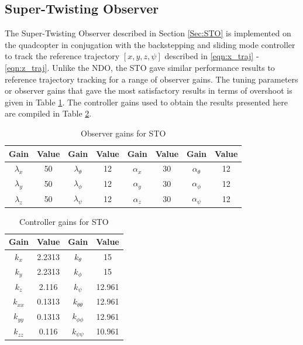\documentclass[letterpaper%
, twoside%
, 12pt%
,memoire%
, english%
,creativecommons,hyperref%
]{thETS}
\begin{document}
\subsection{Super-Twisting Observer}
The Super-Twisting Observer described in Section \ref{Sec:STO} is implemented on the quadcopter in conjugation with the backstepping and sliding mode controller to track the reference trajectory $[x,y,z,\psi]$ described in \eqref{eqn:x_traj} - \eqref{eqn:z_traj}. Unlike the NDO, the STO gave similar performance results to reference trajectory tracking for a range of observer gains. The tuning parameters or observer gains that gave the most satisfactory results in terms of overshoot is given in Table \ref{Tab:realSTOGains}. The controller gains used to obtain the results presented here are compiled in Table \ref{Tab:realControllerGainsSTO}. 

\begin{table}
\parbox{0.65\textwidth}{\caption{Observer gains for STO} \label{Tab:realSTOGains}} 
\begin{tabular}{|c|c|c|c|c|c|c|c|}
\hline
{\bf Gain}&{\bf Value}&{\bf Gain}&{\bf Value}&{\bf Gain}&{\bf Value}&{\bf Gain}&{\bf Value}\\ \hline
$\lambda_x$ & 50 & $\lambda_\theta$  & 12  & $\alpha_x$ & 30 & $\alpha_\theta$  & 12  \\ \hline
$\lambda_y$ & 50 & $\lambda_\phi$    & 12  & $\alpha_y$ & 30 & $\alpha_\phi$    & 12  \\ \hline
$\lambda_z$ & 50 & $\lambda_\psi$    & 12  & $\alpha_z$ & 30 & $\alpha_\psi$    & 12  \\ \hline 
\end{tabular}
\end{table}

\begin{table}
\parbox{0.65\textwidth}{\caption{Controller gains for STO}\label{Tab:realControllerGainsSTO}} 
\begin{tabular}{|c|c|c|c|}
\hline
{\bf Gain} & {\bf Value} & {\bf Gain}         & {\bf Value}  \\ \hline
$k_x$      & 2.2313      & $k_\theta$         & 15           \\ \hline
$k_y$      & 2.2313      & $k_\phi$           & 15           \\ \hline
$k_z$      & 2.116       & $k_\psi$           & 12.961       \\ \hline 
$k_{xx}$   & 0.1313      & $k_{\theta\theta}$ & 12.961       \\ \hline
$k_{yy}$   & 0.1313      & $k_{\phi\phi}$     & 12.961       \\ \hline
$k_{zz}$   & 0.116       & $k_{\psi\psi}$     & 10.961       \\ \hline 
\end{tabular}
\end{table}
\end{document}
